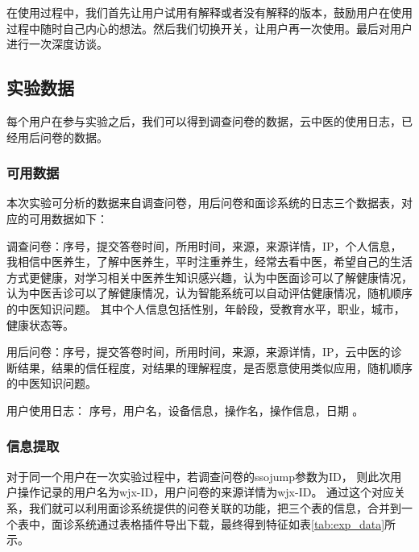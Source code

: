 在使用过程中，我们首先让用户试用有解释或者没有解释的版本，鼓励用户在使用过程中随时自己内心的想法。然后我们切换开关，让用户再一次使用。最后对用户进行一次深度访谈。

\subsection{实验数据}
每个用户在参与实验之后，我们可以得到调查问卷的数据，云中医的使用日志，已经用后问卷的数据。

\subsubsection{可用数据}
本次实验可分析的数据来自调查问卷，用后问卷和面诊系统的日志三个数据表，对应的可用数据如下：

调查问卷：序号，提交答卷时间，所用时间，来源，来源详情，IP，个人信息，我相信中医养生，了解中医养生，平时注重养生，经常去看中医，希望自己的生活方式更健康，对学习相关中医养生知识感兴趣，认为中医面诊可以了解健康情况，认为中医舌诊可以了解健康情况，认为智能系统可以自动评估健康情况，随机顺序的中医知识问题。
其中个人信息包括性别，年龄段，受教育水平，职业，城市，健康状态等。

用后问卷：序号，提交答卷时间，所用时间，来源，来源详情，IP，云中医的诊断结果，结果的信任程度，对结果的理解程度，是否愿意使用类似应用，随机顺序的中医知识问题。

用户使用日志： 序号，用户名，设备信息，操作名，操作信息，日期 。

\subsubsection{信息提取}
对于同一个用户在一次实验过程中，若调查问卷的ssojump参数为ID， 则此次用户操作记录的用户名为wjx-ID，用户问卷的来源详情为wjx-ID。 
通过这个对应关系，我们就可以利用面诊系统提供的问卷关联的功能，把三个表的信息，合并到一个表中，面诊系统通过表格插件导出下载，最终得到特征如表\ref{tab:exp_data}所示。


